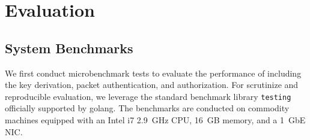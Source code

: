 \chapter{Evaluation}
\label{eval}


\section{System Benchmarks}
\label{sec:systembenchmark}

We first conduct microbenchmark tests to evaluate the performance of \tp including the key
derivation, packet authentication, and authorization. For scrutinize and reproducible evaluation,
we leverage the standard benchmark library \texttt{testing} officially supported by golang.
The benchmarks are conducted on commodity machines equipped with an Intel i7 \SI{2.9}{GHz}
CPU, \SI{16}{GB} memory, and a \SI{1}{GbE} NIC.

